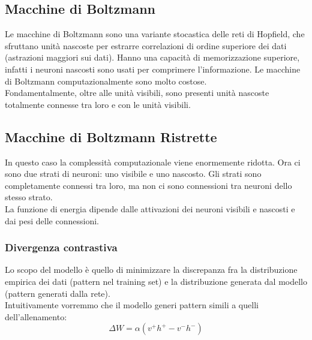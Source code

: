 \subsection{Macchine di Boltzmann}

Le macchine di Boltzmann sono una variante stocastica delle reti di Hopfield,
che sfruttano unità nascoste per estrarre correlazioni di ordine superiore dei
dati (astrazioni maggiori sui dati).
Hanno una capacità di memorizzazione superiore, infatti i neuroni nascosti sono
usati per comprimere l'informazione.
Le macchine di Boltzmann computazionalmente sono molto costose.\\
Fondamentalmente, oltre alle unità visibili, sono presenti unità nascoste
totalmente connesse tra loro e con le unità visibili.

\subsection{Macchine di Boltzmann Ristrette}
 
 In questo caso la complessità computazionale viene enormemente ridotta. Ora ci
 sono due strati di neuroni: uno visibile e uno nascosto. Gli strati sono
 completamente connessi tra loro, ma non ci sono connessioni tra neuroni dello
 stesso strato.\\
 La funzione di energia dipende dalle attivazioni dei neuroni visibili e 
 nascosti e dai pesi delle connessioni.

\subsubsection{Divergenza contrastiva}

Lo scopo del modello è quello di minimizzare la discrepanza fra la distribuzione
empirica dei dati (pattern nel training set) e la distribuzione generata dal
modello (pattern generati dalla rete).\\
Intuitivamente vorremmo che il modello generi pattern simili a quelli
dell'allenamento:
\begin{equation*}
	\Delta W = \alpha(v^{+}h^{+} - v^{-}h^{-})
\end{equation*}

